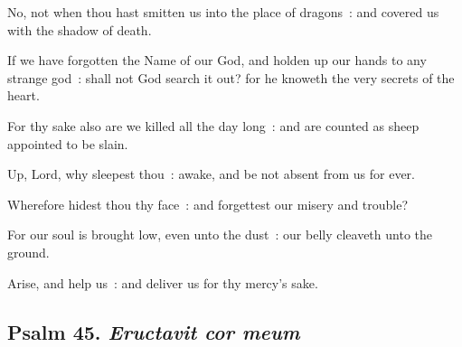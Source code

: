 No, not when thou hast smitten us into the place of dragons~: and covered us with the shadow of death.\par
{}If we have forgotten the Name of our God, and holden up our hands to any strange god~: shall not God search it out? for he knoweth the very secrets of the heart.\par
{}For thy sake also are we killed all the day long~: and are counted as sheep appointed to be slain.\par
{}Up, Lord, why sleepest thou~: awake, and be not absent from us for ever.\par
{}Wherefore hidest thou thy face~: and forgettest our misery and trouble?\par
{}For our soul is brought low, even unto the dust~: our belly cleaveth unto the ground.\par
{}Arise, and help us~: and deliver us for thy mercy's sake.\par

\subsection{Psalm 45. \textit{Eructavit cor meum}}


